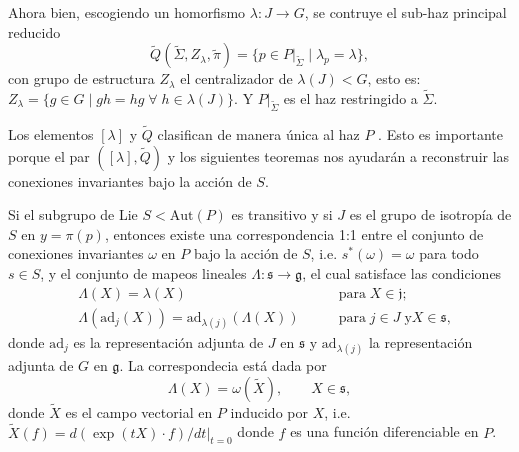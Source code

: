 Ahora bien, escogiendo un homorfismo $\lambda: J \longrightarrow G$, se contruye el sub-haz principal reducido $$\tilde{Q}(\tilde{\Sigma}, Z_{\lambda}, \tilde{\pi}) = \{p \in P \vert_{\tilde{\Sigma}} \; \vert \; \lambda_{p} = \lambda\},$$ con grupo de estructura $Z_{\lambda}$ el centralizador de $\lambda(J) < G$, esto es: $Z_{\lambda} = \{g \in G \; \vert \; gh = hg \; \forall \; h \in \lambda(J)\}.$ Y $P \vert_{\tilde{\Sigma}}$ es el haz restringido a $\tilde{\Sigma}$.

Los elementos $[\lambda]$ y $\tilde{Q}$ clasifican de manera \'{u}nica al haz $P$ \cite{Brodbeck}. Esto es importante porque el par $([\lambda], \tilde{Q})$ y los siguientes teoremas \cite{Kobayashi} nos ayudar\'{a}n a reconstruir las conexiones invariantes bajo la acci\'{o}n de $S$.

\begin{thm}
\label{thm:theorem1}
Si el subgrupo de Lie $S < \mathrm{Aut} (P)$ es transitivo y si $J$ es el grupo de isotrop\'{i}a de $S$ en $y = \pi(p)$, entonces existe una correspondencia 1:1 entre el conjunto de conexiones invariantes $\omega$ en $P$ bajo la acci\'{o}n de $S$, i.e. $s^{*}(\omega) = \omega$ para todo $s \in S$, y el conjunto de mapeos lineales $\Lambda: \mathfrak{s} \longrightarrow \mathfrak{g}$, el cual satisface las condiciones
%
\begin{align}
\label{eq:LambdaCond1}
& \Lambda (X) = \lambda (X) & \mathrm{para} \; X\in \mathfrak{j}; \\
\label{eq:LambdaCond2}
& \Lambda (\mathrm{ad}_{j} (X)) = \mathrm{ad}_{\lambda (j)} (\Lambda (X)) \qquad & \mathrm{para} \; j \in J \; \mathrm{y} X \in \mathfrak{s},
\end{align}
%
donde $\mathrm{ad}_{j}$ es la representaci\'{o}n adjunta de $J$ en $\mathfrak{s}$ y $\mathrm{ad}_{\lambda (j)}$ la representaci\'{o}n adjunta de $G$ en $\mathfrak{g}$. La correspondecia est\'{a} dada por
%
\begin{equation}
\label{eq:correspondence}
\Lambda (X) = \omega (\tilde{X}), \qquad X \in \mathfrak{s},
\end{equation}
%
donde $\tilde{X}$ es el campo vectorial en $P$ inducido por $X$, i.e. $\tilde{X}(f) = d(\exp(t X) \cdot f)/dt \vert_{t=0}$ donde $f$ es una funci\'{o}n diferenciable en $P$.
\end{thm}

